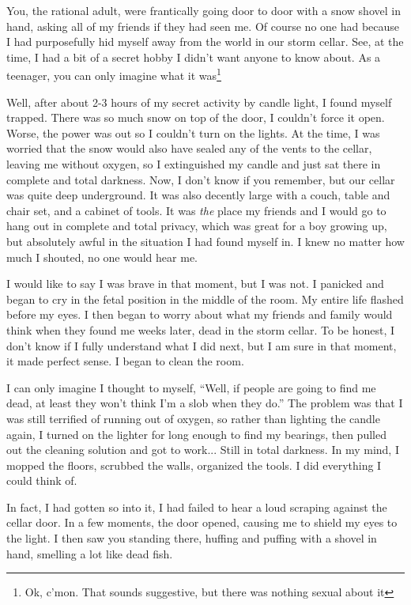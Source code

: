 You, the rational adult, were frantically going door to door with a snow shovel in hand, asking all of my friends if they had seen me.
Of course no one had because I had purposefully hid myself away from the world in our storm cellar.
See, at the time, I had a bit of a secret hobby I didn't want anyone to know about.
As a teenager, you can only imagine what it was\footnote{Ok, c'mon. That sounds suggestive, but there was nothing sexual about it}

Well, after about 2-3 hours of my secret activity by candle light, I found myself trapped.
There was so much snow on top of the door, I couldn't force it open.
Worse, the power was out so I couldn't turn on the lights.
At the time, I was worried that the snow would also have sealed any of the vents to the cellar, leaving me without oxygen, so I extinguished my candle and just sat there in complete and total darkness.
Now, I don't know if you remember, but our cellar was quite deep underground.
It was also decently large with a couch, table and chair set, and a cabinet of tools.
It was \textit{the} place my friends and I would go to hang out in complete and total privacy, which was great for a boy growing up, but absolutely awful in the situation I had found myself in.
I knew no matter how much I shouted, no one would hear me.

I would like to say I was brave in that moment, but I was not.
I panicked and began to cry in the fetal position in the middle of the room.
My entire life flashed before my eyes.
I then began to worry about what my friends and family would think when they found me weeks later, dead in the storm cellar.
To be honest, I don't know if I fully understand what I did next, but I am sure in that moment, it made perfect sense.
I began to clean the room.

I can only imagine I thought to myself, ``Well, if people are going to find me dead, at least they won't think I'm a slob when they do.''
The problem was that I was still terrified of running out of oxygen, so rather than lighting the candle again, I turned on the lighter for long enough to find my bearings, then pulled out the cleaning solution and got to work... Still in total darkness.
In my mind, I mopped the floors, scrubbed the walls, organized the tools.
I did everything I could think of.

In fact, I had gotten so into it, I had failed to hear a loud scraping against the cellar door.
In a few moments, the door opened, causing me to shield my eyes to the light.
I then saw you standing there, huffing and puffing with a shovel in hand, smelling a lot like dead fish.

